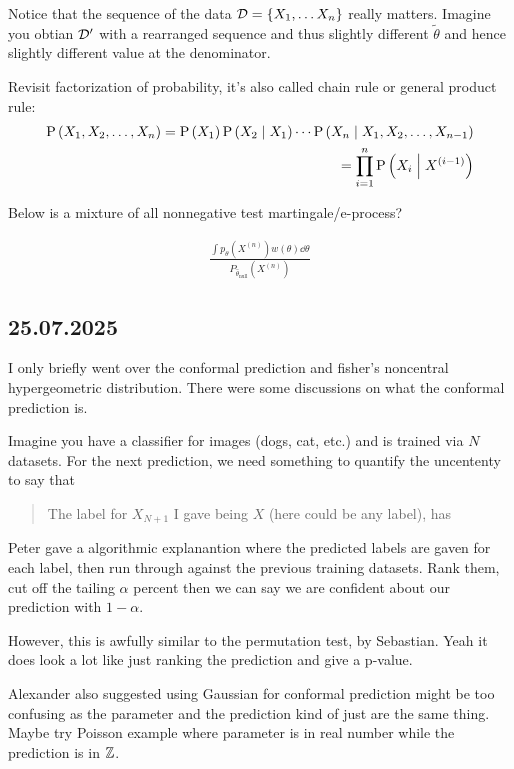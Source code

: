 Notice that the sequence of the data $\mathcal{D}=\{X_1,\dots X_n\}$ really matters.
Imagine you obtian $\mathcal{D}'$ with a rearranged sequence and thus slightly 
different $\tilde{\theta}$ and hence slightly different value at the 
denominator.

Revisit factorization of probability, it's also called chain rule or general product rule:
\begin{align*}
    \PR{X_1,X_2,\dots,X_n} = \PR{X_1}\condPR{X_2}{X_1}\cdots \condPR{X_n}{X_1,X_2,\dots,X_{n-1}} \\
    = \prod_{i=1}^n \condPR{X_i}{X^{(i-1)}}
\end{align*}

\begin{question}
    Below is a mixture of all nonnegative test martingale/e-process?
\end{question}

\begin{align*}
\frac{\int p_{\theta}(X^{(n)}) w(\theta) \dd{\theta}}{P_{\hat{\theta}_{\mathrm{null}}}(X^{(n)})}
\end{align*}


\subsection*{25.07.2025} I only briefly went over the conformal prediction and fisher's noncentral hypergeometric distribution.
There were some discussions on what the conformal prediction is.

Imagine you have a classifier for images (dogs, cat, etc.) and is trained via $N$ datasets. 
For the next prediction, we need something to quantify the uncententy to say that
\begin{quote}
    The label for $X_{N+1}$ I gave being $X$ (here could be any label), has
\end{quote}

Peter gave a algorithmic explanantion where the predicted labels are gaven for each label, 
then run through against the previous training datasets. Rank them, cut off the tailing $\alpha$
percent then we can say we are confident about our prediction with $1-\alpha$.

However, this is awfully similar to the permutation test, by Sebastian. 
Yeah it does look a lot like just ranking the prediction and give a p-value.

Alexander also suggested using Gaussian for conformal prediction might be too confusing 
as the parameter and the prediction kind of just are the same thing. 
Maybe try Poisson example where parameter is in real number while the prediction is in $\mathbb{Z}$.

